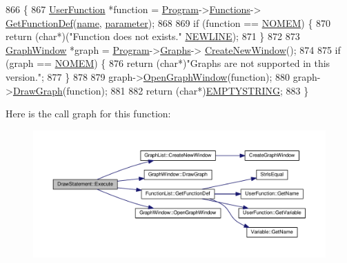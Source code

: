 \begin{DoxyCode}
866 \{
867     \hyperlink{classUserFunction}{UserFunction} *\textcolor{keyword}{function} = \hyperlink{classProgram}{Program}->\hyperlink{classProgram_ac643877adc06800a021263b2234cd236}{Functions}->
      \hyperlink{classFunctionList_acf0716fd18c32a6d52a947052060a2a1}{GetFunctionDef}(\hyperlink{classDrawStatement_a3f94d0d8039a4a683bc0631fc27c6f4c}{name}, \hyperlink{classDrawStatement_a56f4d974e2408e03e1722c319238e7cf}{parameter});
868 
869     \textcolor{keywordflow}{if} (\textcolor{keyword}{function} == \hyperlink{platform_8h_a46ff2bfbf0d44b8466a2251d5bd5e6f8}{NOMEM}) \{
870         \textcolor{keywordflow}{return} (\textcolor{keywordtype}{char}*)(\textcolor{stringliteral}{"Function does not exists."} \hyperlink{platform_8h_a806511f4930171733227c99101dc0606}{NEWLINE});
871     \}
872 
873     \hyperlink{classGraphWindow}{GraphWindow} *graph = \hyperlink{classProgram}{Program}->\hyperlink{classProgram_a9c59323b8c560d2d418a6e6ebcde2e9d}{Graphs}->
      \hyperlink{classGraphList_a184e5ad986cd07281a96dc107ebfcd5d}{CreateNewWindow}();
874 
875     \textcolor{keywordflow}{if} (graph == \hyperlink{platform_8h_a46ff2bfbf0d44b8466a2251d5bd5e6f8}{NOMEM}) \{
876         \textcolor{keywordflow}{return} (\textcolor{keywordtype}{char}*)\textcolor{stringliteral}{"Graphs are not supported in this version."};
877     \}
878 
879     graph->\hyperlink{classGraphWindow_a63309cbe3e1989d9eac566372dc888e8}{OpenGraphWindow}(\textcolor{keyword}{function});
880     graph->\hyperlink{classGraphWindow_a476a4a268feb290df84b6dc4eeac8af2}{DrawGraph}(\textcolor{keyword}{function});
881 
882     \textcolor{keywordflow}{return} (\textcolor{keywordtype}{char}*)\hyperlink{platform_8h_a79ff1b9ff232b38c8b5600659e6bc7c2}{EMPTYSTRING};
883 \}
\end{DoxyCode}


Here is the call graph for this function\+:\nopagebreak
\begin{figure}[H]
\begin{center}
\leavevmode
\includegraphics[width=350pt]{classDrawStatement_af3be5149199ab9940b43ee5a2360ba80_cgraph}
\end{center}
\end{figure}




